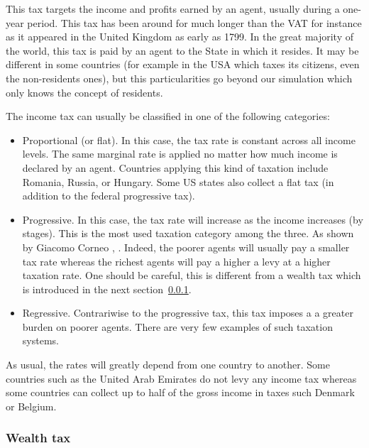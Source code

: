     This tax targets the income and profits earned by an agent, usually during a one-year period. This tax has been around for much longer than the VAT for instance as it appeared in the United Kingdom as early as 1799. In the great majority of the world, this tax is paid by an agent to the State in which it resides. It may be different in some countries (for example in the USA which taxes its citizens, even the non-residents ones), but this particularities go beyond our simulation which only knows the concept of residents.
    
    The income tax can usually be classified in one of the following categories:
    
    \begin{itemize}
        \item Proportional (or flat). In this case, the tax rate is constant across all income levels. The same marginal rate is applied no matter how much income is declared by an agent. Countries applying this kind of taxation include Romania, Russia, or Hungary. Some US states also collect a flat tax (in addition to the federal progressive tax).
        
        \item Progressive. In this case, the tax rate will increase as the income increases (by stages). This is the most used taxation category among the three. As shown by Giacomo Corneo \cite{progressive_taxation}, . Indeed, the poorer agents will usually pay a smaller tax rate whereas the richest agents will pay a higher a levy at a higher taxation rate. One should be careful, this is different from a wealth tax which is introduced in the next section~\ref{section:wealth_tax}.
        
        \item Regressive. Contrariwise to the progressive tax, this tax imposes a a greater burden on poorer agents. There are very few examples of such taxation systems.
    \end{itemize}
    
    As usual, the rates will greatly depend from one country to another. Some countries such as the United Arab Emirates do not levy any income tax whereas some countries can collect up to half of the gross income in taxes such Denmark or Belgium.
    
    \subsubsection{Wealth tax}\label{section:wealth_tax}
    
